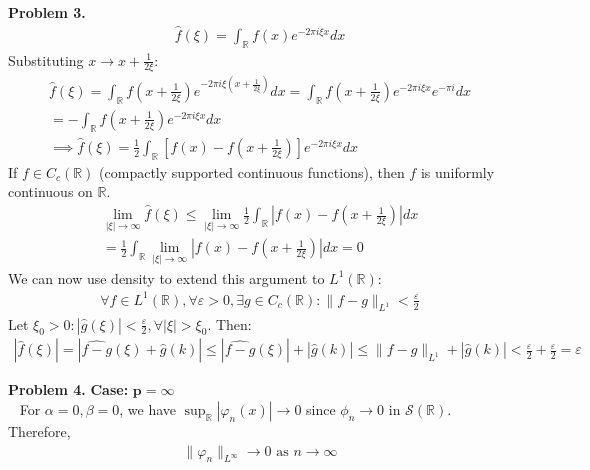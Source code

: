 \documentclass{article}
\newcommand{\R}{\mathbb{R}}
\newcommand{\Sc}{\mathcal{S}}
\begin{document}
\textbf{Problem 3. } 
\begin{gather*}
    \hat{f}(\xi) = \int_{\R} f(x) e^{-2\pi i\xi x}dx
\end{gather*}
Substituting $x \to x + \frac{1}{2\xi}$:
\begin{gather*}
    \hat{f}(\xi) = \int_{\R} f\left(x + \frac{1}{2\xi}\right) e^{-2\pi i \xi (x + \frac{1}{2\xi})} dx = \int_{\R} f\left(x + \frac{1}{2\xi}\right) e^{-2\pi i \xi x} e^{-\pi i} dx \\
    = - \int_{\R} f\left(x + \frac{1}{2\xi}\right) e^{-2\pi i \xi x} dx\\
    \implies \hat{f}(\xi) = \frac{1}{2} \int_{\R} \left[ f(x) - f\left(x + \frac{1}{2\xi}\right) \right] e^{-2\pi i \xi x} dx
\end{gather*}
If $f \in C_c(\R)$ (compactly supported continuous functions), then $f$ is uniformly continuous on $\R$.
\begin{gather*}
    \lim_{|\xi| \to \infty} \hat{f}(\xi) \leq \lim_{|\xi| \to \infty} \frac{1}{2} \int_{\R} \left\lvert f(x) - f\left(x + \frac{1}{2\xi}\right) \right\rvert dx\\
    = \frac{1}{2} \int_{\R} \lim_{|\xi| \to \infty}  \left\lvert f(x) - f\left(x + \frac{1}{2\xi}\right) \right\rvert dx = 0
\end{gather*}
We can now use density to extend this argument to $L^1(\R):$
\begin{gather*}
    \forall f \in L^1(\R), \forall \varepsilon > 0, \exists g \in C_c(\R) :  \lVert f-g \rVert_{L^1} < \frac{\varepsilon}{2}
\end{gather*}
Let $\xi_0 >0: |\hat{g}(\xi)| < \frac{\varepsilon}{2}, \forall |\xi| > \xi_0$. Then:
\begin{gather*}
    |\hat{f}(\xi)| = |\widehat{f-g}(\xi) + \hat{g}(k)| \leq |\widehat{f-g}(\xi)| + |\hat{g}(k)| \leq \lVert f-g \rVert_{L^1} + |\hat{g}(k)| < \frac{\varepsilon}{2} + \frac{\varepsilon}{2} = \varepsilon
\end{gather*}

\textbf{Problem 4. } 
\textbf{Case: } $\boldsymbol{p = \infty}$
\\~
For $\alpha=0,\beta=0$, we have $\sup_{\R} |\varphi_n(x)| \to 0$ since $\phi_n \to 0$ in $\Sc(\R)$. Therefore,
\begin{gather*}
    \lVert \varphi_n \rVert_{L^{\infty}} \to 0 \text{ as } n\to\infty
\end{gather*}
\end{document}
